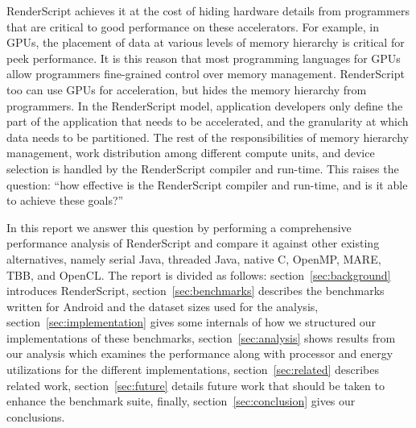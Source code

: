 RenderScript achieves it at the cost of
hiding hardware details from programmers that are critical to good
performance on these accelerators. For example, in GPUs, the placement of data at
various levels of memory hierarchy is critical for peek performance.  It is this
reason that most programming languages for GPUs allow programmers fine-grained
control over memory management. RenderScript too can use GPUs for acceleration,
but hides the memory hierarchy from programmers. In the
RenderScript model, application developers only define the part of the
application that needs to be accelerated, and the granularity at which data
needs to be partitioned. The rest of the responsibilities of memory
hierarchy management, work distribution among different compute units, and device selection
is handled by the RenderScript compiler and run-time. 
This raises the question: ``how
effective is the RenderScript compiler and run-time, and is it able to achieve these goals?''

In this report we answer this question 
by performing a comprehensive performance analysis of RenderScript and compare
it against other existing alternatives, namely
serial Java, threaded Java, native C, OpenMP, MARE, TBB, and OpenCL.
The report is divided as follows: section~\ref{sec:background} introduces 
RenderScript, section~\ref{sec:benchmarks} describes the benchmarks written for
Android and the dataset sizes
used for the analysis,
section~\ref{sec:implementation} gives some internals of how we structured our
implementations of these benchmarks,
section~\ref{sec:analysis} shows results from our analysis which
examines the performance along with processor and energy utilizations for the
different implementations,
section~\ref{sec:related} describes related work,
section~\ref{sec:future} details future work that should be taken to
enhance the benchmark suite,
finally, section~\ref{sec:conclusion} gives our conclusions.
